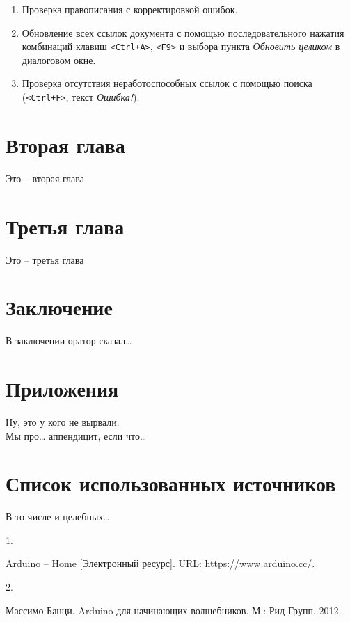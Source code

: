 \documentclass[
  a4paper,
]{book}
\providecommand{\tightlist}{%
  \setlength{\itemsep}{0pt}\setlength{\parskip}{0pt}}
\newlength{\cslhangindent}
\newlength{\csllabelwidth}
\newlength{\cslentryspacing}
\newcommand{\CSLLeftMargin}[1]{\parbox[t]{\csllabelwidth}{#1}}
\newcommand{\CSLRightInline}[1]{\parbox[t]{\linewidth - \csllabelwidth}{#1}\break}
\theoremstyle{definition}
\theoremstyle{definition}
\theoremstyle{definition}
\theoremstyle{definition}
\theoremstyle{remark}
\begin{document}
\begin{itemize}
  \begin{enumerate}
  \def\labelenumi{\arabic{enumi}.}
  \tightlist
  \item
    Проверка правописания с корректировкой ошибок.
  \item
    Обновление всех ссылок документа с помощью последовательного нажатия комбинаций клавиш \texttt{\textless{}Ctrl+A\textgreater{}}, \texttt{\textless{}F9\textgreater{}} и выбора пункта \emph{Обновить целиком} в диалоговом окне.
  \item
    Проверка отсутствия неработоспособных ссылок с помощью поиска (\texttt{\textless{}Ctrl+F\textgreater{}}, текст \emph{Ошибка!}).
  \end{enumerate}
\end{itemize}

\chapter{Вторая глава}\label{chapter2}

Это -- вторая глава

\chapter{Третья глава}\label{chapter3}

Это -- третья глава

\chapter*{Заключение}\label{conclusion}

В заключении оратор сказал\ldots{}

\chapter*{Приложения}\label{appendix}

Ну, это у кого не вырвали.\\
Мы про\ldots{} аппендицит, если что\ldots{}

\chapter*{Список использованных источников}\label{references}

В то числе и целебных\ldots{}

\label{refs}
\setlength{\cslhangindent}{0em}
\setlength{\cslentryspacing}{0em}
\begin{CSLReferences}
\CSLLeftMargin{1. }%
\CSLRightInline{Arduino -- Home {[}Электронный ресурс{]}. URL: \url{https://www.arduino.cc/}.}

\CSLLeftMargin{2. }%
\CSLRightInline{Массимо Банци. Arduino для начинающих волшебников. М.: Рид Групп, 2012.}

\end{CSLReferences}
\end{document}
